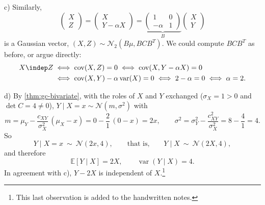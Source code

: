 \begin{example}
c) Similarly,
\[
  \begin{pmatrix}X\\Z\end{pmatrix}=\begin{pmatrix}X\\Y-\alpha X\end{pmatrix}
  =\underbrace{\begin{pmatrix}1&0\\-\alpha&1\end{pmatrix}}_{B}\begin{pmatrix}X\\Y\end{pmatrix}
\]
is a Gaussian vector, $(X,Z)\sim\mathcal N_2(B\mu,BCB^T)$. We could compute $BCB^T$ as before, or
argue directly:
\[
\begin{aligned}
  X\indep Z&\iff\operatorname{cov}(X,Z)=0\iff\operatorname{cov}(X,Y-\alpha X)=0\\
  &\iff\operatorname{cov}(X,Y)-\alpha\operatorname{var}(X)=0\iff2-\alpha=0\iff\alpha=2 .
\end{aligned}
\]

d) By \cref{thm:gc-bivariate}, with the roles of $X$ and $Y$ exchanged ($\sigma_X=1>0$ and
$\det C=4\ne0$), $Y\mid X=x\sim\mathcal N(m,\sigma^2)$ with
\[
  m=\mu_Y-\frac{c_{XY}}{\sigma_X^2}\,(\mu_X-x)=0-\frac21\,(0-x)=2x,\qquad
  \sigma^2=\sigma_Y^2-\frac{c_{XY}^2}{\sigma_X^2}=8-\frac41=4 .
\]
So
\[
  Y\mid X=x\ \sim\ \mathcal N(2x,4),\qquad\text{that is,}\qquad Y\mid X\ \sim\ \mathcal N(2X,4),
\]
and therefore
\[
  \mathbb E[Y\mid X]=2X,\qquad\operatorname{var}(Y\mid X)=4 .
\]
In agreement with c), $Y-2X$ is independent of $X$.\footnote{This last observation is added to the
handwritten notes.}
\end{example}

